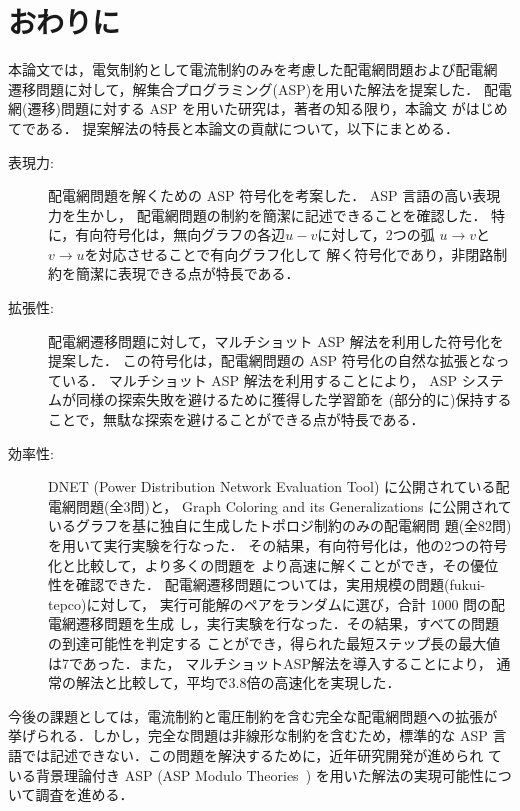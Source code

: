 ﻿\chapter{おわりに}\label{chap:conc}

本論文では，電気制約として電流制約のみを考慮した配電網問題および配電網
遷移問題に対して，解集合プログラミング(ASP)を用いた解法を提案した．
配電網(遷移)問題に対する ASP を用いた研究は，著者の知る限り，本論文
がはじめてである．
提案解法の特長と本論文の貢献について，以下にまとめる．

\begin{description}
\item[表現力:]
  配電網問題を解くための ASP 符号化を考案した．
  ASP 言語の高い表現力を生かし，
  配電網問題の制約を簡潔に記述できることを確認した．
  特に，有向符号化は，無向グラフの各辺$u-v$に対して，2つの弧
  $u\rightarrow v$と$v\rightarrow u$を対応させることで有向グラフ化して
  解く符号化であり，非閉路制約を簡潔に表現できる点が特長である．
\item[拡張性:]
  配電網遷移問題に対して，マルチショット ASP 解法を利用した符号化を提案した．
  この符号化は，配電網問題の ASP 符号化の自然な拡張となっている．
  マルチショット ASP 解法を利用することにより，
  ASP システムが同様の探索失敗を避けるために獲得した学習節を
  (部分的に)保持することで，無駄な探索を避けることができる点が特長である．
\item[効率性:]
  DNET (Power Distribution Network Evaluation Tool)
  に公開されている配電網問題(全3問)と，
  Graph Coloring and its Generalizations
  に公開されているグラフを基に独自に生成したトポロジ制約のみの配電網問
  題(全82問)を用いて実行実験を行なった．
  その結果，有向符号化は，他の2つの符号化と比較して，より多くの問題を
  より高速に解くことができ，その優位性を確認できた．
  配電網遷移問題については，実用規模の問題({\sf fukui-tepco})に対して，
  実行可能解のペアをランダムに選び，合計 1000 問の配電網遷移問題を生成
  し，実行実験を行なった．その結果，すべての問題の到達可能性を判定する
  ことができ，得られた最短ステップ長の最大値は7であった．また，
  マルチショットASP解法を導入することにより，
  通常の解法と比較して，平均で3.8倍の高速化を実現した．
\end{description}

今後の課題としては，電流制約と電圧制約を含む完全な配電網問題への拡張が
挙げられる．しかし，完全な問題は非線形な制約を含むため，標準的な ASP
言語では記述できない．この問題を解決するために，近年研究開発が進められ
ている背景理論付き ASP (ASP Modulo Theories~\cite{DBLP:conf/iclp/GebserKKOSW16}) 
を用いた解法の実現可能性について調査を進める．

